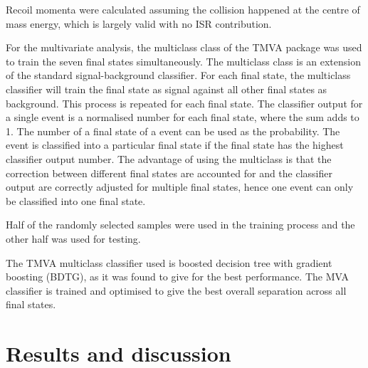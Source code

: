 \documentclass[a4paper,11pt]{article}
\begin{document}
Recoil momenta were calculated assuming the \Pelectron\APelectron collision happened at the centre of mass energy, which is largely valid with no ISR contribution. %

For the multivariate analysis, the multiclass class of the TMVA package \cite{Therhaag:2009dp} was used to train the seven final states simultaneously. The multiclass class is an extension of the standard signal-background classifier. For each final state, the multiclass classifier will train the final state as signal against all other final states as background. This process is repeated for each final state. The classifier output for a single event is a normalised number for each final state, where the sum adds to 1. The number of a final state of a event can be used as the probability. The event is classified into a particular final state if the final state has the highest classifier output number. The advantage of using the multiclass is that the correction between different final states are accounted for and the classifier output are correctly adjusted for multiple final states, hence one event can only be classified into one final state.

Half of the randomly selected samples were used in the training process and the other half was used for testing. 

The TMVA multiclass classifier used is boosted decision tree with gradient boosting (BDTG), as it was found to give for the best performance. The MVA classifier is trained and optimised to give the best overall separation across all final states.

\section{Results and discussion}
\end{document}
